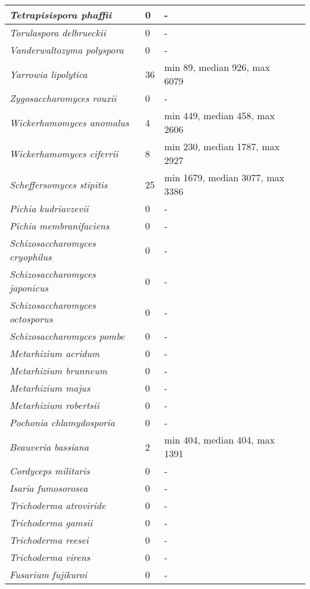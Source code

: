 {\begin{longtable}{| L{4cm} | L{2cm}  | L{5cm} | L{4cm} |}
\textit{Tetrapisispora phaffii} & 0 & - & \\ \hline
\textit{Torulaspora delbrueckii} & 0 & - & \\ \hline
\textit{Vanderwaltozyma polyspora} & 0 & - & \\ \hline
\textit{Yarrowia lipolytica} & 36 & min 89, median 926, max 6079 & \\ \hline
\textit{Zygosaccharomyces rouxii} & 0 & - & \\ \hline
\textit{Wickerhamomyces anomalus} & 4 & min 449, median 458, max 2606 & \\ \hline
\textit{Wickerhamomyces ciferrii} & 8 & min 230, median 1787, max 2927 & \\ \hline
\textit{Scheffersomyces stipitis} & 25 & min 1679, median 3077, max 3386 & \\ \hline
\textit{Pichia kudriavzevii} & 0 & - & \\ \hline
\textit{Pichia membranifaciens} & 0 & - & \\ \hline
\textit{Schizosaccharomyces cryophilus} & 0 & - & \\ \hline
\textit{Schizosaccharomyces japonicus} & 0 & - & \\ \hline
\textit{Schizosaccharomyces octosporus} & 0 & - & \\ \hline
\textit{Schizosaccharomyces pombe} & 0 & - & \\ \hline
\textit{Metarhizium acridum} & 0 & - & \\ \hline
\textit{Metarhizium brunneum} & 0 & - & \\ \hline
\textit{Metarhizium majus} & 0 & - & \\ \hline
\textit{Metarhizium robertsii} & 0 & - & \\ \hline
\textit{Pochonia chlamydosporia} & 0 & - & \\ \hline
\textit{Beauveria bassiana} & 2 & min 404, median 404, max 1391 & \\ \hline
\textit{Cordyceps militaris} & 0 & - & \\ \hline
\textit{Isaria fumosorosea} & 0 & - & \\ \hline
\textit{Trichoderma atroviride} & 0 & - & \\ \hline
\textit{Trichoderma gamsii} & 0 & - & \\ \hline
\textit{Trichoderma reesei} & 0 & - & \\ \hline
\textit{Trichoderma virens} & 0 & - & \\ \hline
\textit{Fusarium fujikuroi} & 0 & - & \\ \hline

\end{longtable}}
